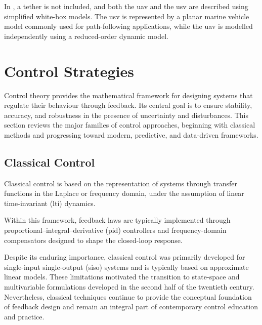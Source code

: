 In \cite{zhangCooperativeControlFramework2025}, a tether is not included, and both the \gls{uav} and the \gls{usv} are described using simplified white-box models. The \gls{usv} is represented by a planar marine vehicle model commonly used for path-following applications, while the \gls{uav} is modelled independently using a reduced-order dynamic model. 





\section{Control Strategies}

Control theory provides the mathematical framework for designing systems that regulate their behaviour through feedback. 
Its central goal is to ensure stability, accuracy, and robustness in the presence of uncertainty and disturbances. 
This section reviews the major families of control approaches, beginning with classical methods and progressing toward modern, predictive, and data-driven frameworks.

\subsection{Classical Control}

Classical control is based on the representation of systems through transfer functions in the Laplace or frequency domain, under the assumption of linear time-invariant (\gls{lti}) dynamics.

Within this framework, feedback laws are typically implemented through proportional--integral--derivative (\gls{pid}) controllers and frequency-domain compensators designed to shape the closed-loop response. 

Despite its enduring importance, classical control was primarily developed for single-input single-output (\gls{siso}) systems and is typically based on approximate linear models. 
These limitations motivated the transition to state-space and multivariable formulations developed in the second half of the twentieth century. 
Nevertheless, classical techniques continue to provide the conceptual foundation of feedback design and remain an integral part of contemporary control education and practice.

